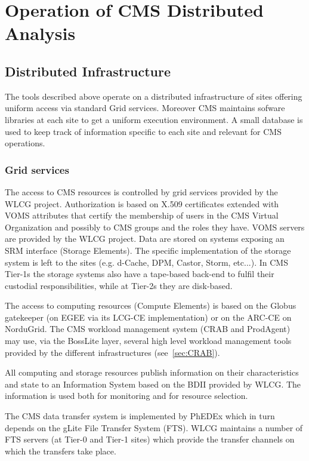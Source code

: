 \section{Operation of CMS Distributed Analysis}
\label{sec:4}
\subsection{Distributed Infrastructure}
\label{sec:4_1}
The tools described above operate on a distributed infrastructure
of sites offering uniform access via standard Grid services. Moreover CMS maintains sofware libraries at each site to get a uniform execution
environment. A small database is used to keep track of
information specific to each site and relevant for CMS operations.

\subsubsection{ Grid services }
\label{sec:4_1_1}

The access to CMS resources is controlled by grid services provided by the WLCG project.
Authorization is based on X.509 certificates extended with VOMS attributes
that certify the membership of users in the CMS Virtual Organization and possibly 
to CMS groups and the roles they have.
VOMS servers are provided by the WLCG project.
Data are stored on systems exposing an SRM interface (Storage Elements).
The specific implementation of the storage system is left to the sites
(e.g. d-Cache, DPM, Castor, Storm, etc...). In CMS Tier-1s the storage
systems also have a tape-based back-end to fulfil their custodial
responsibilities, while at Tier-2s they are disk-based.

The access to computing resources (Compute Elements) is based on
the Globus gatekeeper (on EGEE via its LCG-CE implementation) or on the ARC-CE on NorduGrid.
The CMS workload management system (CRAB and ProdAgent) may use, via the BossLite layer,
several high level workload management tools provided by the different infrastructures
(see~\ref{sec:CRAB}).


All computing and storage resources publish information on their
characteristics and state to an Information System based
on the BDII provided by WLCG. The information is used both
for monitoring and for resource selection.

The CMS data transfer system is implemented by PhEDEx which
in turn depends on the gLite File Transfer System (FTS).
WLCG maintains a number of FTS servers (at Tier-0 and Tier-1 sites)
which provide the transfer channels on which the transfers take place.


